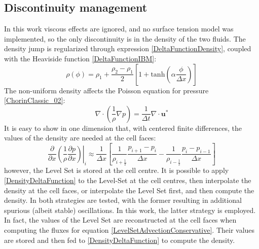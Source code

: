 \documentclass[11pt, a4paper, oneside, openany]{book}
\begin{document}
\subsection{Discontinuity management}
In this work viscous effects are ignored, and no surface tension model was implemented, so the only discontinuity is in the density of the two fluids. The density jump is regularized through expression \eqref{DeltaFunctionDensity}, coupled with the Heaviside function \eqref{DeltaFunctionIBM}:
\begin{equation*}
\rho\left(\phi\right)=\rho_{1}+\dfrac{\rho_{2}-\rho_{1}}{2}\left[1+\mathrm{tanh}\left(\alpha\dfrac{\phi}{\Delta x}\right)\right]\label{DensityDeltaFunction}
\end{equation*}
The non-uniform density affects the Poisson equation for pressure \eqref{ChorinClassic_02}:
\begin{equation*}
	\nabla\cdot\left(\dfrac{1}{\rho}\nabla p\right)=\frac{1}{\Delta t}\nabla\cdot\boldsymbol{u}^{*}\label{PoissonPressureVarDensity}
\end{equation*}
It is easy to show in one dimension that, with centered finite differences, the values of the density are needed at the cell faces:
\begin{equation*}
	\left.\dfrac{\partial}{\partial x}\left(\dfrac{1}{\rho}\dfrac{\partial p}{\partial x}\right)\right|_{i}\approx\dfrac{1}{\Delta x}\left[\dfrac{1}{\rho_{i+\frac{1}{2}}}\dfrac{p_{i+1}-p_{i}}{\Delta x}-\dfrac{1}{\rho_{i-\frac{1}{2}}}\dfrac{p_{i}-p_{i-1}}{\Delta x}\right]
\end{equation*}
however, the Level Set is stored at the cell centre. It is possible to apply \eqref{DensityDeltaFunction} to the Level-Set at the cell centres, then interpolate the density at the cell faces, or interpolate the Level Set first, and then compute the density. In \cite {BIHS2016191} both strategies are tested, with the former resulting in additional spurious (albeit stable) oscillations. In this work, the latter strategy is employed. In fact, the values of the Level Set are reconstructed at the cell faces when computing the fluxes for equation \eqref{LevelSetAdvectionConservative}. Their values are stored and then fed to \eqref{DensityDeltaFunction} to compute the density.
\end{document}
